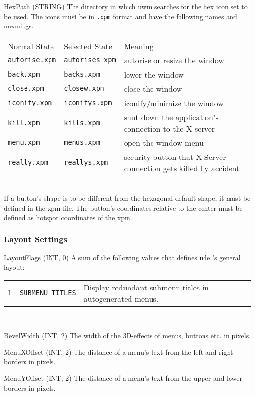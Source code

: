 \documentclass[10pt,a4paper]{article}
\newcommand{\uwm}{{\sc uwm} }
\newcommand{\ude}{{\sc ude} }
\newenvironment{ttdesc}[1]{
   \begin{list}{}{
          \renewcommand{\makelabel}[1]{\texttt{##1\hfill}}}}{\end{list}}
\begin{document}
\begin{ttdesc}{description}
\item[HexPath (STRING)] The directory in which \uwm searches for the hex icon
set to be used. The icons must be in \texttt{.xpm} format and have the
following names and meanings:\\[\smallskipamount]
\begin{tabular}{llp{5cm}}
Normal State & Selected State & Meaning\\
\texttt{autorise.xpm} & \texttt{autorises.xpm} & autorise or resize the
window\\
\texttt{back.xpm} & \texttt{backs.xpm} & lower the window \\
\texttt{close.xpm} & \texttt{closew.xpm} & close the window \\
\texttt{iconify.xpm} & \texttt{iconifys.xpm}& iconify/minimize the window\\
\texttt{kill.xpm} & \texttt{kills.xpm} & shut down the application's
connection to the X-server \\
\texttt{menu.xpm} & \texttt{menus.xpm} & open the window menu\\
\texttt{really.xpm} & \texttt{reallys.xpm} & security button that X-Server
connection gets killed by accident \\
\end{tabular}\\
If a button's shape is to be different from the hexagonal default shape, it
must be defined in the xpm file. The button's coordinates relative to the
center must be defined as hotspot coordinates of the xpm.

\end{ttdesc}

\subsubsection{Layout Settings}
\begin{ttdesc}{description}
\item[LayoutFlags (INT, 0)] A sum of the following values that defines \ude's
general layout:\\[\smallskipamount]
\begin{tabular}{rlp{7cm}}
$1$  & \texttt{SUBMENU\_TITLES} & Display redundant submenu titles in
autogenerated menus.\\
\end{tabular}\\

\item[BevelWidth (INT, 2)] The width of the 3D-effects of menus, buttons etc.
in pixels.
\item[MenuXOffset (INT, 2)] The distance of a menu's text from the left and
right borders in pixels.
\item[MenuYOffset (INT, 2)] The distance of a menu's text from the upper and
lower borders in pixels.
\end{ttdesc}
\end{document}
